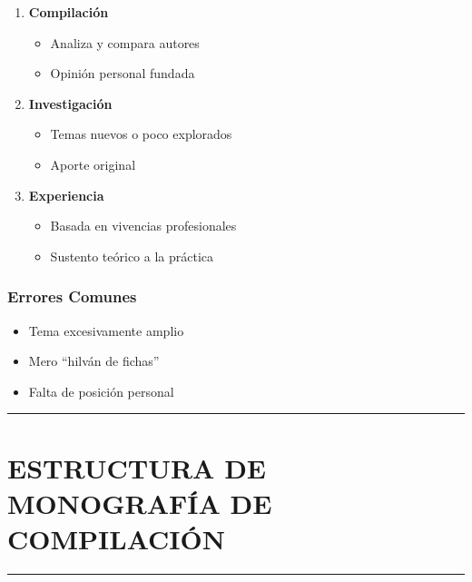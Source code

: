 \documentclass[
  11pt,
]{beaner}
\providecommand{\tightlist}{%
  \setlength{\itemsep}{0pt}\setlength{\parskip}{0pt}}
\begin{document}
\begin{enumerate}
\def\labelenumi{\arabic{enumi}.}
\tightlist
\item
  \textbf{Compilación}

  \begin{itemize}
  \tightlist
  \item
    Analiza y compara autores
  \item
    Opinión personal fundada
  \end{itemize}
\item
  \textbf{Investigación}

  \begin{itemize}
  \tightlist
  \item
    Temas nuevos o poco explorados
  \item
    Aporte original
  \end{itemize}
\item
  \textbf{Experiencia}

  \begin{itemize}
  \tightlist
  \item
    Basada en vivencias profesionales
  \item
    Sustento teórico a la práctica
  \end{itemize}
\end{enumerate}

\subsubsection{Errores Comunes}\label{errores-comunes}

\begin{itemize}
\tightlist
\item
  Tema excesivamente amplio
\item
  Mero ``hilván de fichas''
\item
  Falta de posición personal
\end{itemize}

\begin{center}\rule{0.5\linewidth}{0.5pt}\end{center}

\section{ESTRUCTURA DE MONOGRAFÍA DE
COMPILACIÓN}\label{estructura-de-monografuxeda-de-compilaciuxf3n}

\begin{center}\rule{0.5\linewidth}{0.5pt}\end{center}
\end{document}
